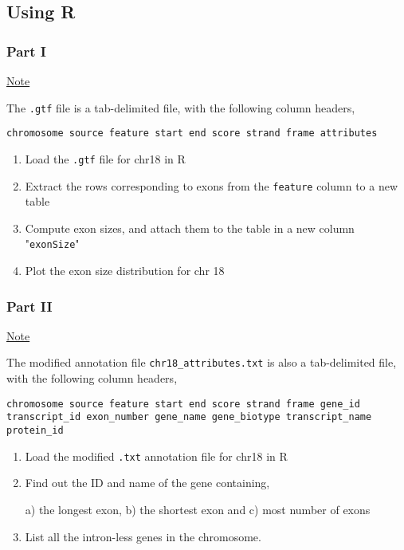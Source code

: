 \documentclass[a4paper,11pt]{article}
\begin{document}
\subsection{Using R}
\subsubsection{Part I}

\normalsize\underline{Note}

\normalsize The \texttt{.gtf} file is a tab-delimited file, with the following column headers,

\scriptsize\texttt {chromosome	source	feature	start	end	score	strand	frame	attributes}

\begin{enumerate}
\normalsize\item Load the \texttt{.gtf} file for chr18 in R
\item Extract the rows corresponding to exons from the \texttt{feature} column to a new table
\item Compute exon sizes, and attach them to the table in a new column "\texttt{exonSize}"
\item Plot the exon size distribution for chr 18
\end{enumerate}

\subsubsection{Part II}

\normalsize\underline{Note}

\normalsize The modified annotation file \texttt{chr18\_attributes.txt} is also a tab-delimited file, with the \indent following column headers,

\scriptsize\texttt {chromosome	source	feature	start	end	score	strand	frame	gene\_id	 transcript\_id 	 exon\_number 	 gene\_name 	 gene\_biotype 	 \indent transcript\_name 	 protein\_id }

\begin{enumerate}
\normalsize\item Load the modified \texttt{.txt} annotation file for chr18 in R
\item Find out the ID and name of the gene containing,

 a) the longest exon, b) the shortest exon and c) most number of exons
\item List all the intron-less genes in the chromosome.
\end{enumerate}
\end{document}
